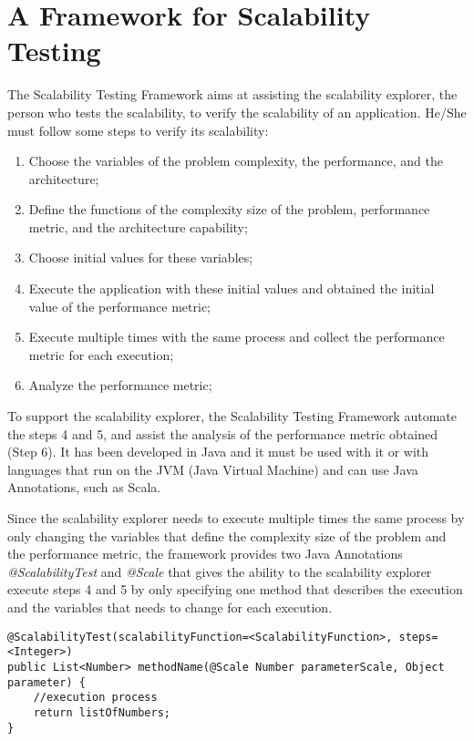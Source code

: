 \section{A Framework for Scalability Testing}

The Scalability Testing Framework aims at assisting the scalability explorer, the person who tests the scalability, to verify the scalability of an application. He/She must follow some steps to verify its scalability:

\begin{enumerate}
\item Choose the variables of the problem complexity, the performance, and the architecture;
\item Define the functions of the complexity size of the problem, performance metric, and the architecture capability;
\item Choose initial values for these variables;
\item Execute the application with these initial values and obtained the initial value of the performance metric;
\item Execute multiple times with the same process and collect the performance metric for each execution;
\item Analyze the performance metric;
\end{enumerate}

To support the scalability explorer, the Scalability Testing Framework automate the steps 4 and 5, and assist the analysis of the performance metric obtained (Step 6). It has been developed in Java and it must be used with it or with languages that run on the JVM (Java Virtual Machine) and can use Java Annotations, such as Scala.

Since the scalability explorer needs to execute multiple times the same process by only changing the variables that define the complexity size of the problem and the performance metric, the framework provides two Java Annotations \emph{@ScalabilityTest} and \emph{@Scale} that gives the ability to the scalability explorer execute steps 4 and 5 by only specifying one method that describes the execution and the variables that needs to change for each execution.

\begin{lstlisting}
@ScalabilityTest(scalabilityFunction=<ScalabilityFunction>, steps=<Integer>)
public List<Number> methodName(@Scale Number parameterScale, Object parameter) {
	//execution process
	return listOfNumbers;
}

\end{lstlisting}

